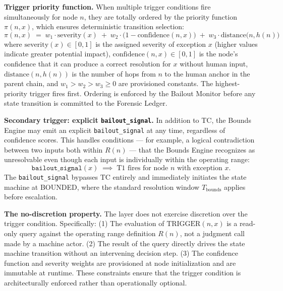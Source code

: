 \bigskip
\noindent\textbf{Trigger priority function.} When multiple trigger conditions fire simultaneously for node $n$, they are totally ordered by the priority function $\pi(n, x)$, which ensures deterministic transition selection:
\begin{equation}
\pi(n, x) \;=\; w_1 \cdot \text{severity}(x) \;+\; w_2 \cdot \bigl(1 - \text{confidence}(n, x)\bigr) \;+\; w_3 \cdot \text{distance}\bigl(n, h(n)\bigr) \tag{PF}
\end{equation}
where $\text{severity}(x) \in [0, 1]$ is the assigned severity of exception $x$ (higher values indicate greater potential impact), $\text{confidence}(n, x) \in [0, 1]$ is the node's confidence that it can produce a correct resolution for $x$ without human input, $\text{distance}(n, h(n))$ is the number of hops from $n$ to the human anchor in the parent chain, and $w_1 > w_2 > w_3 \geq 0$ are provisioned constants. The highest-priority trigger fires first. Ordering is enforced by the Bailout Monitor before any state transition is committed to the Forensic Ledger.

\bigskip
\noindent\textbf{Secondary trigger: explicit \texttt{bailout\_signal}.} In addition to TC, the Bounds Engine may emit an explicit \texttt{bailout\_signal} at any time, regardless of confidence scores. This handles conditions --- for example, a logical contradiction between two inputs both within $R(n)$ --- that the Bounds Engine recognizes as unresolvable even though each input is individually within the operating range:
\begin{equation}
\texttt{bailout\_signal}(x) \;\implies\; \text{T1 fires for node } n \text{ with exception } x. \tag{TC-secondary}
\end{equation}
The \texttt{bailout\_signal} bypasses TC entirely and immediately initiates the state machine at BOUNDED, where the standard resolution window $T_{\text{bounds}}$ applies before escalation.

\bigskip
\noindent\textbf{The no-discretion property.} The \bounds{} layer does not exercise discretion over the trigger condition. Specifically: (1) The evaluation of $\text{TRIGGER}(n, x)$ is a read-only query against the operating range definition $R(n)$, not a judgment call made by a machine actor. (2) The result of the query directly drives the state machine transition without an intervening decision step. (3) The confidence function and severity weights are provisioned at node initialization and are immutable at runtime. These constraints ensure that the trigger condition is architecturally enforced rather than operationally optional.

